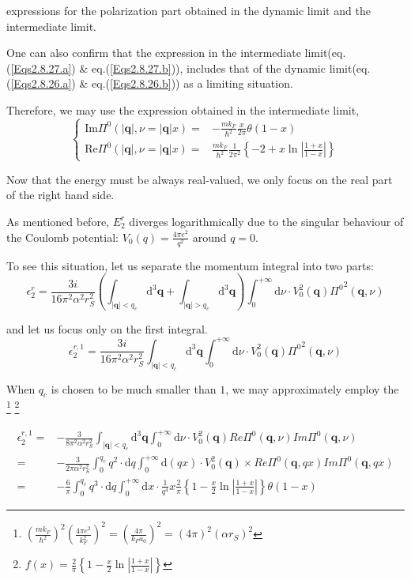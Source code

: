 expressions for the polarization part obtained in the dynamic limit and the intermediate limit.

One can also confirm that the expression in the intermediate limit(eq.(\ref{Eqs2.8.27.a}) \& eq.(\ref{Eqs2.8.27.b})), includes that of the dynamic limit(eq.(\ref{Eqs2.8.26.a}) \& eq.(\ref{Eqs2.8.26.b})) as a limiting situation.

Therefore, we may use the expression obtained in the intermediate limit,
\[\left\{ \begin{aligned}
\text{Im} \Pi^0(|\mathbf{q}|, \nu = |\mathbf{q}| x) =& - \frac{m k_F}{\hbar^2} \frac{x}{2\pi} \theta(1-x)\\
\text{Re} \Pi^0(|\mathbf{q}|, \nu = |\mathbf{q}| x) =& \frac{m k_F}{\hbar^2}\frac{1}{2\pi^2}\left\{ -2 + x \ln\left| \frac{1+x}{1-x} \right| \right\}
\end{aligned} \right.\]

Now that the energy must be always real-valued, we only focus on the real part of the right hand side.

As mentioned before, $E_2^r$ diverges logarithmically due to the singular behaviour of the Coulomb potential: $V_0(q) = \frac{4\pi e^2}{q^2}$ around $q=0$.

To see this situation, let us separate the momentum integral into two parts:
\[ \epsilon_2^r = \frac{3i}{16\pi^2 \alpha^2 r_S^2} \left( \int_{|\mathbf{q}|<q_c} \mathrm{d}^3 \mathbf{q} + \int_{|\mathbf{q}|>q_c} \mathrm{d}^3 \mathbf{q} \right) \int_0^{+\infty} \mathrm{d} \nu \cdot V_0^2(\mathbf{q}) {\Pi^0}^2(\mathbf{q},\nu) \]

and let us focus only on the first integral.
\begin{equation*} \label{Eqs2.8.9.c} \tag{2.8.9.c}
\epsilon_2^{r,1} = \frac{3i}{16\pi^2 \alpha^2 r_S^2} \int_{|\mathbf{q}|<q_c} \mathrm{d}^3 \mathbf{q} \int_0^{+\infty} \mathrm{d} \nu \cdot V_0^2(\mathbf{q}) {\Pi^0}^2(\mathbf{q},\nu)
\end{equation*}

When $q_c$ is chosen to be much smaller than $1$, we may approximately employ the
\footnote{$\left(\frac{m k_F}{\hbar^2}\right)^2\left( \frac{4\pi e^2}{k_F^2} \right)^2 = \left( \frac{4\pi}{k_F a_0} \right)^2 = (4\pi)^2(\alpha r_S)^2$}
\footnote{$f(x)=\frac{2}{\pi} \left\{ 1 - \frac{x}{2} \ln\left| \frac{1+x}{1-x} \right| \right\}$}

\[\begin{split}
\epsilon_2^{r,1} =& -\frac{3}{8\pi^2 \alpha^2 r_S^2} \int_{|\mathbf{q}|<q_c} \mathrm{d}^3 \mathbf{q} \int_0^{+\infty} \mathrm{d} \nu \cdot V_0^2(\mathbf{q}) Re\Pi^0(\mathbf{q},\nu) Im\Pi^0(\mathbf{q},\nu)\\
=&-\frac{3}{2\pi \alpha^2 r_S^2} \int_0^{q_c} q^2 \cdot \mathrm{d} q \int_0^{+\infty} \mathrm{d} (q x) \cdot V_0^2(\mathbf{q}) \times Re\Pi^0(\mathbf{q},q x) Im\Pi^0(\mathbf{q},q x)\\
=& -\frac{6}{\pi} \int_0^{q_c} q^3 \cdot \mathrm{d} q \int_0^{+\infty} \mathrm{d} x \cdot \frac{1}{q^4} x \frac{2}{\pi} \left\{ 1 - \frac{x}{2} \ln\left| \frac{1+x}{1-x} \right| \right\} \theta(1-x)
\end{split}\]

